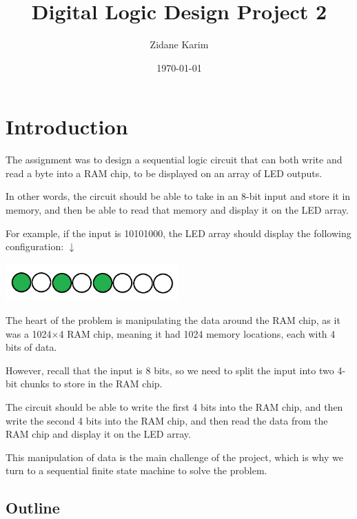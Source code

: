 \documentclass{article}
\title{Digital Logic Design Project 2} %
\author{Zidane Karim} %
\date{\today} %
\begin{document}
    \maketitle %
    \tableofcontents

    \section{Introduction} %
    
        
    The assignment was to design a sequential logic circuit that can both write and read a byte into a RAM chip, to be displayed on an array of LED outputs. 
    
    In other words, the circuit should be able to take in an 8-bit input and store it in memory, and then be able to read that memory and display it on the LED array.
    
    For example, if the input is 10101000, the LED array should display the following configuration: $\downarrow$

    \begin{center}
        \includegraphics[width=0.5\textwidth]{LED_Output_Paint.png}
    \end{center}

    The heart of the problem is manipulating the data around the RAM chip, as it was a 1024$\times$4 RAM chip, meaning it had 1024 memory locations, each with 4 bits of data.
    
    However, recall that the input is 8 bits, so we need to split the input into two 4-bit chunks to store in the RAM chip.
    
    The circuit should be able to write the first 4 bits into the RAM chip, and then write the second 4 bits into the RAM chip, and then read the data from the RAM chip and display it on the LED array.
    
    This manipulation of data is the main challenge of the project, which is why we turn to a sequential finite state machine to solve the problem.

    \subsection{Outline}
\end{document}
